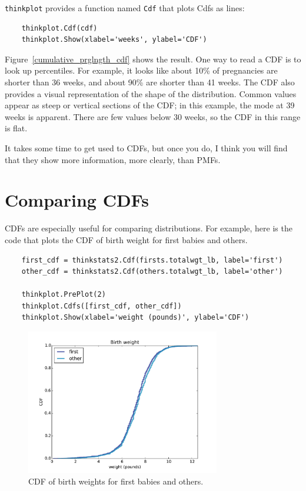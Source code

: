 \documentclass[12pt]{book}
\begin{document}
{\tt thinkplot} provides a function named {\tt Cdf} that
plots Cdfs as lines:

\begin{verbatim}
    thinkplot.Cdf(cdf)
    thinkplot.Show(xlabel='weeks', ylabel='CDF')
\end{verbatim}

Figure~\ref{cumulative_prglngth_cdf} shows the result.  One way to
read a CDF is to look up percentiles.  For example, it looks like
about 10\% of pregnancies are shorter than 36 weeks, and about 90\%
are shorter than 41 weeks.  The CDF also provides a visual
representation of the shape of the distribution.  Common values appear
as steep or vertical sections of the CDF; in this example, the mode at
39 weeks is apparent.  There are few values below 30 weeks, so
the CDF in this range is flat.

It takes some time to get used to CDFs, but once you
do, I think you will find that they show more information, more
clearly, than PMFs.


\section{Comparing CDFs}
\label{birth_weights}

CDFs are especially useful for comparing distributions.  For
example, here is the code that plots the CDF of birth
weight for first babies and others.

\begin{verbatim}
    first_cdf = thinkstats2.Cdf(firsts.totalwgt_lb, label='first')
    other_cdf = thinkstats2.Cdf(others.totalwgt_lb, label='other')

    thinkplot.PrePlot(2)
    thinkplot.Cdfs([first_cdf, other_cdf])
    thinkplot.Show(xlabel='weight (pounds)', ylabel='CDF')
\end{verbatim}

\begin{figure}
\centerline{\includegraphics[height=2.5in]{figs/cumulative_birthwgt_cdf.pdf}}
\caption{CDF of birth weights for first babies and others.}
\label{cumulative_birthwgt_cdf}
\end{figure}
\end{document}
